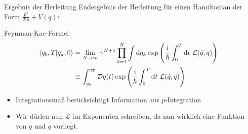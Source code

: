 
\begin{frame}{Ergebnis der Herleitung}
Endergebnis der Herleitung für einen Hamiltonian der Form $\frac{p^2}{2m} + V(q)$:
\begin{block}{Feynman-Kac-Formel}
\begin{align*}
	 \braket{q_b,T}{q_a,0} &= \lim_{N \rightarrow\infty} \gamma^{N+1}\prod_{k=1}^{N} \int\dd q_k \exp\left(\frac{\mathrm{i}}{\hbar}\int_{0}^{T}\dd t \ \mathcal{L}(\dot{q},q)\right) \\
	 &\equiv \int_{q_0}^{q_T} \mathcal{D}q(t) \exp\left(\frac{\mathrm{i}}{\hbar}\int_{0}^{T}\dd t \ \mathcal{L}(\dot{q},q)\right)
\end{align*}	
\end{block}
\begin{itemize}
	\item Integrationsmaß berücksichtigt Information aus $p$-Integration 
	\item Wir dürfen nun $\mathcal{L}$ im Exponenten schreiben, da nun wirklich eine Funktion von $\dot{q}$ und $q$ vorliegt.
\end{itemize}	
\end{frame}